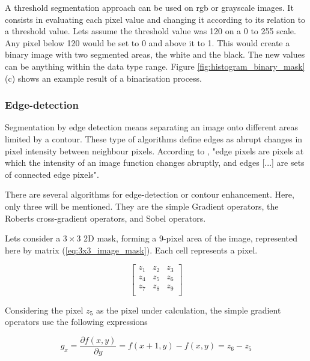 A threshold segmentation approach can be used on \gls{rgb} or grayscale images. It consists in evaluating each pixel value and changing it according to its relation to a threshold value. Lets assume the threshold value was 120 on a 0 to 255 scale. Any pixel below 120 would be set to 0 and above it to 1. This would create a binary image with two segmented areas, the white and the black. The new values can be anything within the data type range. Figure \ref{fig:histogram_binary_mask} (c) shows an example result of a binarisation process.


\subsubsection*{Edge-detection}
\label{subsubsec:image_segmentation_edge_detection}

Segmentation by edge detection means separating an image onto different areas limited by a contour. These type of algorithms define edges as abrupt changes in pixel intensity between neighbour pixels. According to \cite{Gonzalez2008_digital_image_processing}, "edge pixels are pixels at which the intensity of an image function changes abruptly, and edges [...] are sets of connected edge pixels".

There are several algorithms for edge-detection or contour enhancement. Here, only three will be mentioned. They are the simple Gradient operators, the Roberts cross-gradient operators, and Sobel operators.

Lets consider a $3\times 3$ 2D mask, forming a 9-pixel area of the image, represented here by matrix (\ref{eq:3x3_image_mask}). Each cell represents a pixel.

\begin{equation}
    \label{eq:3x3_image_mask}
    \begin{bmatrix}
        z_1 & z_2 & z_3 \\
        z_4 & z_5 & z_6 \\
        z_7 & z_8 & z_9 \\
    \end{bmatrix}
\end{equation}

Considering the pixel $z_5$ as the pixel under calculation, the simple gradient operators use the following expressions \cite{Gonzalez2008_digital_image_processing}

\begin{equation}
    \label{eq:gradient_operators_x}
    g_x = \frac{\partial f(x,y)}{\partial y} = f(x+1,y)-f(x,y) = z_6 - z_5
\end{equation}

